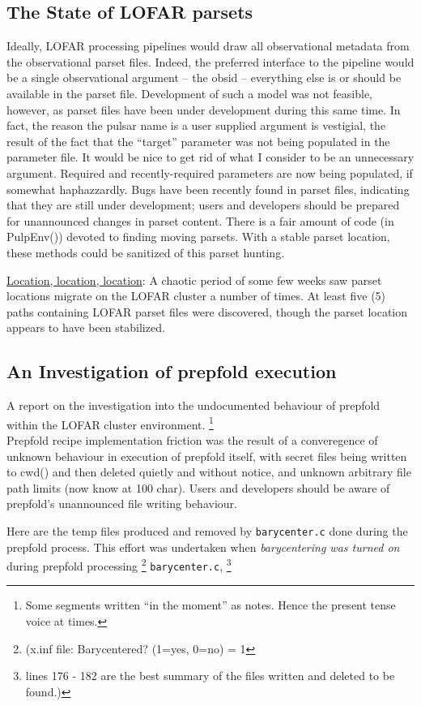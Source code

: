 \documentclass[a4paper,10pt,bibtotoc]{scrartcl}
\begin{document}
\subsection{The State of LOFAR parsets}
Ideally, LOFAR processing pipelines would draw all observational
metadata from the observational parset files.  Indeed, the preferred
interface to the pipeline would be a single observational argument --
the obsid -- everything else is or should be available in the parset
file. Development of such a model was not feasible, however, as parset
files have been under development during this same time.  In fact, the
reason the pulsar name is a user supplied argument is vestigial, the
result of the fact that the ``target'' parameter was not being
populated in the parameter file. It would be nice to get rid of what I
consider to be an unnecessary argument. Required and recently-required
parameters are now being populated, if somewhat haphazzardly.  Bugs
have been recently found in parset files, indicating that they are
still under development; users and developers should be prepared for
unannounced changes in parset content.  There is a fair amount of code
(in PulpEnv()) devoted to finding moving parsets.  With a stable
parset location, these methods could be sanitized of this parset
hunting.

\underline{Location, location, location}: A chaotic period of some few
weeks saw parset locations migrate on the LOFAR cluster a number of
times. At least five (5) paths containing LOFAR parset files were
discovered, though the parset location appears to have been stabilized.

\subsection{An Investigation of prepfold execution}
A report on the investigation into the undocumented behaviour of
prepfold within the LOFAR cluster environment. \footnote{Some
  segments written ``in the moment'' as notes. Hence the present tense
  voice at times.}\\

Prepfold recipe implementation friction was the result
of a converegence of unknown behaviour in execution of prepfold
itself, with secret files being written to cwd() and then deleted
quietly and without notice, and unknown arbitrary file path limits
(now know at 100 char). Users and developers should be aware of
prepfold's unannounced file writing behaviour.

Here are the temp files produced and removed by 
\texttt{barycenter.c} done during the prepfold process.  This effort
was undertaken when \textit{barycentering was turned on} during 
prepfold processing \footnote{(x.inf file: Barycentered?           (1=yes, 0=no)  =  1}
\texttt{barycenter.c}, \footnote{lines 176 - 182 are the best summary
  of the files written and deleted to be found.)}
\end{document}
